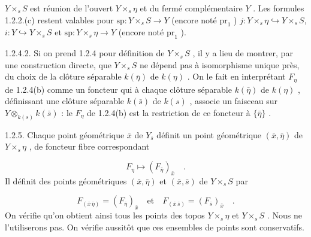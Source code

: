 $Y \times_s S$ est réunion de l'ouvert $Y \times_s \eta$ et du fermé complémentaire $Y$ . Les formules 1.2.2.(c) restent valables pour $\mathrm{sp} : Y \times_s S \longrightarrow Y$ (encore noté $\mathrm{pr}_1$ ) $j : Y \times_s \eta \hookrightarrow Y \times_s S$, $i : Y \hookrightarrow Y \times_s S$ et $\mathrm{sp} : Y \times_s \eta \longrightarrow Y$ (encore noté $\mathrm{pr}_1$ ).

1.2.4.2. Si on prend 1.2.4 pour définition de $Y \times_s S$ , il y a lieu de montrer, par une construction directe, que $Y \times_s S$ ne dépend pas à isomorphisme unique près, du choix de la clôture séparable $k(\bar{\eta})$ de $k(\eta)$ . On le fait en interprétant $F_\eta$ de 1.2.4(b) comme un foncteur qui à chaque clôture séparable $k(\bar{\eta})$ de $k(\eta)$ , définissant une clôture séparable $k(\bar{s})$ de $k(s)$ , associe un faisceau sur $Y \otimes_{k(s)} k(\bar{s})$ : le $F_\eta$ de 1.2.4(b) est la restriction de ce foncteur à $\{\bar{\eta}\}$ .



1.2.5. Chaque point géométrique $\bar{x}$ de $Y_{\bar{s}}$ définit un point géométrique $(\bar{x},\bar{\eta})$ de $Y \times_s \eta$ , de foncteur fibre correspondant

\begin{equation*}
F_\eta \longmapsto (F_{\bar{\eta}})_{\bar{x}} \quad .
\end{equation*}
Il définit des points géométriques $(\bar{x},\bar{\eta})$ et $(\bar{x}, \bar{s})$ de $Y \times_s S$ par

\begin{equation*}
F_{(\bar{x}\,\bar{\eta})} = (F_{\bar{\eta}})_{\bar{x}} \quad \mbox{et} \quad F_{(\bar{x}\,\bar{s})} = (F_{\bar{s}})_{\bar{x}} \quad .
\end{equation*}
On vérifie qu'on obtient ainsi tous les points des topos $Y \times_s \eta$ et $Y \times_s S$ . Nous ne l'utiliserons pas. On vérifie aussitôt que ces ensembles de points sont conservatifs.

